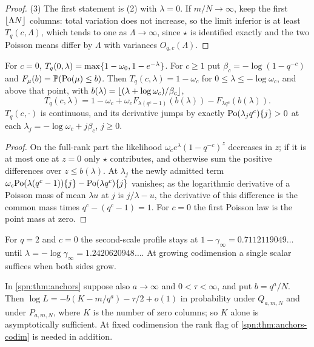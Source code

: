 \begin{proof}
(3) The first statement is (2) with $\lambda=0$. If $m/N\to\infty$, keep the first $\lfloor\Lambda N\rfloor$
columns: total variation does not increase, so the limit inferior is at least $T_q(c,\Lambda)$, which
tends to one as $\Lambda\to\infty$, since $\star$ is identified exactly and the two Poisson means differ by
$\Lambda$ with variances $O_{q,c}(\Lambda)$.
\end{proof}

\begin{corollary}\label{spn:cor:anchors-corners}
For $c=0$, $T_q(0,\lambda)=\max\{1-\omega_0,1-e^{-\lambda}\}$. For $c\ge1$ put
$\beta_c=-\log(1-q^{-c})$ and $F_\mu(b)=\mathbb{P}(\mathrm{Po}(\mu)\le b)$. Then $T_q(c,\lambda)=1-\omega_c$
for $0\le\lambda\le-\log\omega_c$, and above that point, with
$b(\lambda)=\lfloor(\lambda+\log\omega_c)/\beta_c\rfloor$,
\[
 T_q(c,\lambda)=1-\omega_c+\omega_cF_{\lambda(q^c-1)}(b(\lambda))-F_{\lambda q^c}(b(\lambda)).
\]
$T_q(c,\cdot)$ is continuous, and its derivative jumps by exactly $\mathrm{Po}(\lambda_jq^c)\{j\}>0$ at
each $\lambda_j=-\log\omega_c+j\beta_c$, $j\ge0$.
\end{corollary}

\begin{proof}
On the full-rank part the likelihood $\omega_ce^\lambda(1-q^{-c})^z$ decreases in $z$; if it is at most one
at $z=0$ only $\star$ contributes, and otherwise sum the positive differences over $z\le b(\lambda)$. At
$\lambda_j$ the newly admitted term $\omega_c\mathrm{Po}(\lambda(q^c-1))\{j\}-\mathrm{Po}(\lambda q^c)\{j\}$
vanishes; as the logarithmic derivative of a Poisson mass of mean $\lambda u$ at $j$ is $j/\lambda-u$, the
derivative of this difference is the common mass times $q^c-(q^c-1)=1$. For $c=0$ the first Poisson law
is the point mass at zero.
\end{proof}

For $q=2$ and $c=0$ the second-scale profile stays at $1-\gamma_\infty=0.7112119049\ldots$ until
$\lambda=-\log\gamma_\infty=1.2420620948\ldots$. At growing codimension a single scalar suffices when
both sides grow.

\begin{corollary}\label{spn:cor:anchors-scalar}
In \cref{spn:thm:anchors} suppose also $a\to\infty$ and $0<\tau<\infty$, and put $b=q^a/N$. Then
$\log L=-b(K-m/q^a)-\tau/2+o(1)$ in probability under $Q_{a,m,N}$ and under $P_{a,m,N}$, where $K$ is the
number of zero columns; so $K$ alone is asymptotically sufficient. At fixed codimension the rank flag of
\cref{spn:thm:anchors-codim} is needed in addition.
\end{corollary}

